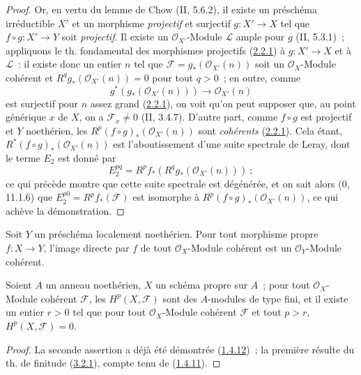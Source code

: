 \begin{proof}
Or, en vertu du lemme de Chow (II, 5.6.2), il existe un préschéma
irréductible $X'$ et un morphisme \emph{projectif} et surjectif
$g:X'\to X$ tel que $f\circ g:X'\to Y$ soit \emph{projectif}. Il existe un
$\mathcal O_{X'}$-Module $\mathcal L$ ample pour $g$ (II, 5.3.1)~;
appliquons le th. fondamental des morphismes projectifs
(\hyperref[III.2.2.1-fr]{2.2.1}) à $g:X'\to X$ et à $\mathcal L$~: il
existe donc un entier $n$ tel que
$\mathcal F=g_*(\mathcal O_{X'}(n))$ soit un $\mathcal O_X$-Module cohérent
et $R^qg_*(\mathcal O_{X'}(n))=0$ pour tout $q>0$~; en outre, comme
\[
g^*(g_*(\mathcal O_{X'}(n)))\longrightarrow\mathcal O_{X'}(n)
\]
est surjectif pour $n$ assez grand (\hyperref[III.2.2.1-fr]{2.2.1}), on
voit qu'on peut supposer que, au point générique $x$ de $X$, on a
$\mathcal F_x\neq0$ (II, 3.4.7). D'autre part, comme $f\circ g$ est
projectif et $Y$ noethérien, les
$R^p(f\circ g)_*(\mathcal O_{X'}(n))$ sont \emph{cohérents}
(\hyperref[III.2.2.1-fr]{2.2.1}). Cela étant,
$R^*(f\circ g)_*(\mathcal O_{X'}(n))$ est l'aboutissement d'une suite
spectrale de Leray, dont le terme $E_2$ est donné par
\[
E_2^{pq}=R^pf_*(R^qg_*(\mathcal O_{X'}(n)))~;
\]
ce qui précède montre que cette suite spectrale est dégénérée, et on sait
alors (0, 11.1.6) que $E_2^{p0}=R^pf_*(\mathcal F)$ est isomorphe à
$R^p(f\circ g)_*(\mathcal O_{X'}(n))$, ce qui achève la démonstration.
\end{proof}

\begin{corollary}[3.2.2]
\label{III.3.2.2-fr}
Soit $Y$ un préschéma localement noethérien. Pour tout morphisme propre
$f:X\to Y$, l'image directe par $f$ de tout $\mathcal O_X$-Module cohérent
est un $\mathcal O_Y$-Module cohérent.
\end{corollary}

\begin{corollary}[3.2.3]
\label{III.3.2.3-fr}
Soient $A$ un anneau noethérien, $X$ un schéma propre sur $A$~; pour tout
$\mathcal O_X$-Module cohérent $\mathcal F$, les $H^p(X,\mathcal F)$ sont
des $A$-modules de type fini, et il existe un entier $r>0$ tel que pour tout
$\mathcal O_X$-Module cohérent $\mathcal F$ et tout $p>r$,
$H^p(X,\mathcal F)=0$.
\end{corollary}

\begin{proof}
La seconde assertion a déjà été démontrée
(\hyperref[III.1.4.12-fr]{1.4.12})~; la première résulte du th. de finitude
(\hyperref[III.3.2.1-fr]{3.2.1}), compte tenu de
(\hyperref[III.1.4.11-fr]{1.4.11}).
\end{proof}

